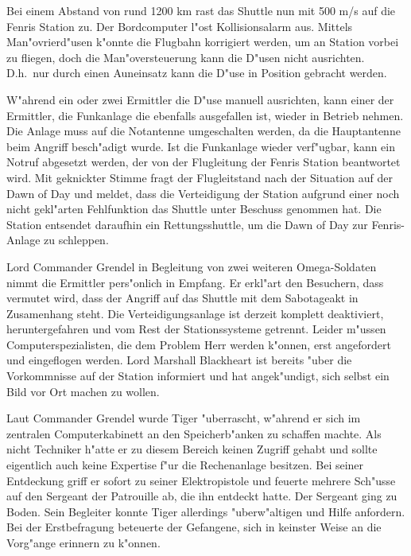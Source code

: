 Bei einem Abstand von rund 1200 km rast das Shuttle nun mit 500 m/s auf die Fenris Station zu. Der Bordcomputer l"ost Kollisionsalarm aus. Mittels Man"ovrierd"usen k"onnte die Flugbahn korrigiert werden, um an Station vorbei zu fliegen, doch die Man"oversteuerung kann die D"usen nicht ausrichten. D.h.~nur durch einen Au\3neinsatz kann die D"use in Position gebracht werden.

W"ahrend ein oder zwei Ermittler die D"use manuell ausrichten, kann einer der Ermittler, die Funkanlage die ebenfalls ausgefallen ist, wieder in Betrieb nehmen. Die Anlage muss auf die Notantenne umgeschalten werden, da die Hauptantenne beim Angriff besch"adigt wurde. Ist die Funkanlage wieder verf"ugbar, kann ein Notruf abgesetzt werden, der von der Flugleitung der Fenris Station beantwortet wird. Mit geknickter Stimme fragt der Flugleitstand nach der Situation auf der Dawn of Day und meldet, dass die Verteidigung der Station aufgrund einer noch nicht gekl"arten Fehlfunktion das Shuttle unter Beschuss genommen hat. Die Station entsendet daraufhin ein Rettungsshuttle, um die Dawn of Day zur Fenris-Anlage zu schleppen.

Lord Commander Grendel in Begleitung von zwei weiteren Omega-Soldaten nimmt die Ermittler pers"onlich in Empfang. Er erkl"art den Besuchern, dass vermutet wird, dass der Angriff auf das Shuttle mit dem Sabotageakt in Zusamenhang steht. Die Verteidigungsanlage ist derzeit komplett deaktiviert, heruntergefahren und vom Rest der Stationssysteme getrennt. Leider m"ussen Computerspezialisten, die dem Problem Herr werden k"onnen, erst angefordert und eingeflogen werden. Lord Marshall Blackheart ist bereits "uber die Vorkommnisse auf der Station informiert und hat angek"undigt, sich selbst ein Bild vor Ort machen zu wollen.

Laut Commander Grendel wurde Tiger "uberrascht, w"ahrend er sich im zentralen Computerkabinett an den Speicherb"anken zu schaffen machte. Als nicht Techniker h"atte er zu diesem Bereich keinen Zugriff gehabt und sollte eigentlich auch  keine Expertise f"ur die Rechenanlage besitzen. Bei seiner Entdeckung griff er sofort zu seiner Elektropistole und feuerte mehrere Sch"usse auf den Sergeant der Patrouille ab, die ihn entdeckt hatte. Der Sergeant ging zu Boden. Sein Begleiter konnte Tiger allerdings "uberw"altigen und Hilfe anfordern. Bei der Erstbefragung beteuerte der Gefangene, sich in keinster Weise an die Vorg"ange erinnern zu k"onnen.

